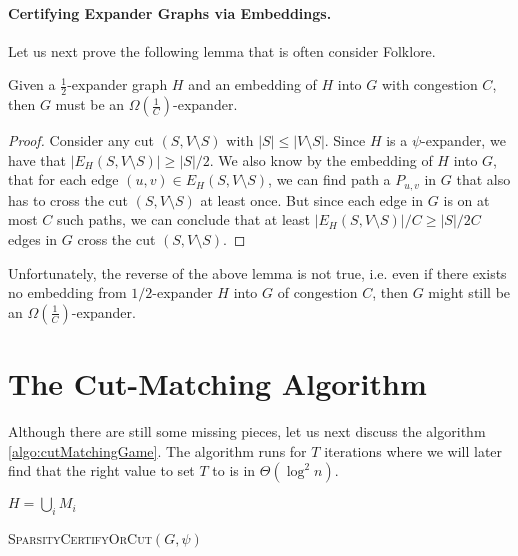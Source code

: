 \paragraph{Certifying Expander Graphs via Embeddings.} Let us next prove the following lemma that is often consider Folklore.

\begin{lemma}\label{lma:folklore_embedding}
Given a $\frac{1}{2}$-expander graph $H$ and an embedding of $H$ into $G$ with congestion $C$, then $G$ must be an $\Omega\left(\frac{1}{C}\right)$-expander. 
\end{lemma}
\begin{proof}
Consider any cut $(S, V \setminus S)$ with $|S| \leq |V \setminus S|$. Since $H$ is a $\psi$-expander, we have that $|E_H(S, V \setminus S)| \geq |S|/2$. We also know by the embedding of $H$ into $G$, that for each edge $(u,v) \in E_H(S, V \setminus S)$, we can find path a $P_{u,v}$ in $G$ that also has to cross the cut $(S, V \setminus S)$ at least once. But since each edge in $G$ is on at most $C$ such paths, we can conclude that at least $|E_H(S, V \setminus S)|/ C \geq |S|/2C$ edges in $G$ cross the cut $(S, V \setminus S)$. 
\end{proof}
 
Unfortunately, the reverse of the above lemma is not true, i.e. even if there exists no embedding from $1/2$-expander $H$ into $G$ of congestion $C$, then $G$ might still be an $\Omega\left(\frac{1}{C}\right)$-expander. 

\section{The Cut-Matching Algorithm}

Although there are still some missing pieces, let us next discuss the algorithm   \ref{algo:cutMatchingGame}. The algorithm runs for $T$ iterations where we will later find that the right value to set $T$ to is in $\Theta(\log^2 n)$. 

\begin{algorithm}[H]
    \Return $H = \bigcup_{i} M_i$
  \caption{\textsc{SparsityCertifyOrCut}$(G, \psi)$}
  \label{algo:cutMatchingGame}
\end{algorithm}


